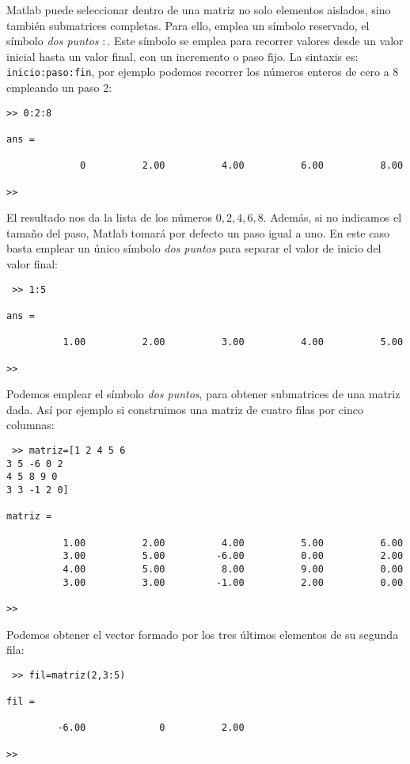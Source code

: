 Matlab puede seleccionar dentro de una matriz no solo elementos aislados, sino también submatrices completas. Para ello, emplea un símbolo reservado, el símbolo \emph{dos puntos} $:$. Este símbolo se emplea para recorrer valores desde un valor inicial hasta un valor final, con un incremento o paso fijo. La sintaxis es: \texttt{inicio:paso:fin}, por ejemplo podemos recorrer los números enteros de cero a 8 empleando un paso 2:
\begin{verbatim}
>> 0:2:8

ans =

             0          2.00          4.00          6.00          8.00

>> 
\end{verbatim}

El resultado nos da la lista de los números $0, 2, 4, 6, 8$.
Además, si no indicamos el tamaño del paso,  Matlab tomará por defecto un paso igual a uno. En este caso basta emplear un único símbolo \emph{dos puntos} para separar el valor de inicio del valor final:
 \begin{verbatim}
 >> 1:5

ans =

          1.00          2.00          3.00          4.00          5.00

>>
 \end{verbatim}
 
 Podemos emplear el símbolo \emph{dos puntos},  para obtener submatrices de una matriz dada. Así por ejemplo si construimos una matriz de cuatro filas por cinco columnas:
 \begin{verbatim}
 >> matriz=[1 2 4 5 6
3 5 -6 0 2
4 5 8 9 0
3 3 -1 2 0]

matriz =

          1.00          2.00          4.00          5.00          6.00
          3.00          5.00         -6.00          0.00          2.00
          4.00          5.00          8.00          9.00          0.00
          3.00          3.00         -1.00          2.00          0.00

>> 
 \end{verbatim}
 Podemos obtener el vector formado por los tres últimos elementos de su segunda fila:
 \begin{verbatim}
 >> fil=matriz(2,3:5)

fil =

         -6.00             0          2.00

>> 
 \end{verbatim}

